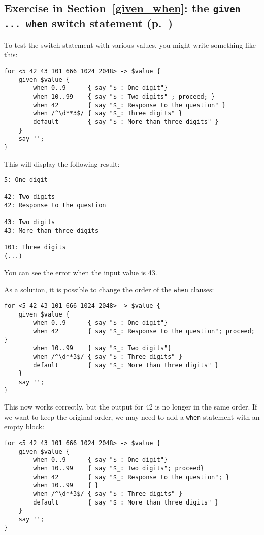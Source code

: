 {\subsection{Exercise in Section~\ref{given_when}: the {\tt given ... when} switch statement (p.~\pageref{proceed_ex})}
\label{sol_proceed_ex}

To test the switch statement with various values, you might 
write something like this:

\begin{verbatim}
for <5 42 43 101 666 1024 2048> -> $value {
    given $value {
        when 0..9      { say "$_: One digit"}
        when 10..99    { say "$_: Two digits" ; proceed; }
        when 42        { say "$_: Response to the question" }
        when /^\d**3$/ { say "$_: Three digits" }
        default        { say "$_: More than three digits" }
    }
    say '';
}
\end{verbatim}

This will display the following result:

\begin{verbatim}
5: One digit

42: Two digits
42: Response to the question

43: Two digits
43: More than three digits

101: Three digits
(...)
\end{verbatim}

You can see the error when the input value is 43.

As a solution, it is possible to change the order of the 
{\tt when} clauses:

\begin{verbatim}
for <5 42 43 101 666 1024 2048> -> $value {
    given $value {
        when 0..9      { say "$_: One digit"}
        when 42        { say "$_: Response to the question"; proceed; }
        when 10..99    { say "$_: Two digits"}
        when /^\d**3$/ { say "$_: Three digits" }
        default        { say "$_: More than three digits" }
    }
    say '';
}
\end{verbatim}

This now works correctly, but the output for 42 is no longer 
in the same order. If we want to keep the original order,  
we may need to add a {\tt when} statement with an empty block:

\begin{verbatim}
for <5 42 43 101 666 1024 2048> -> $value {
    given $value {
        when 0..9      { say "$_: One digit"}
        when 10..99    { say "$_: Two digits"; proceed}
        when 42        { say "$_: Response to the question"; }
        when 10..99    { }
        when /^\d**3$/ { say "$_: Three digits" }
        default        { say "$_: More than three digits" }
    }
    say '';
}
\end{verbatim}

}
